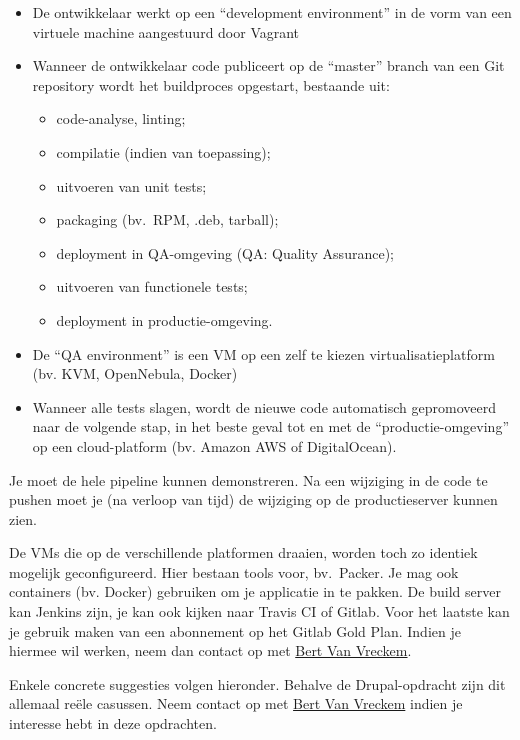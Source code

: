 \begin{itemize}
\item De ontwikkelaar werkt op een ``development environment'' in de vorm van een virtuele machine aangestuurd door Vagrant
\item Wanneer de ontwikkelaar code publiceert op de ``master'' branch van een Git repository wordt het buildproces opgestart, bestaande uit:

  \begin{itemize}
  \item code-analyse, linting;
  \item compilatie (indien van toepassing);
  \item uitvoeren van unit tests;
  \item packaging (bv.~RPM, .deb, tarball);
  \item deployment in QA-omgeving (QA: Quality Assurance);
  \item uitvoeren van functionele tests;
  \item deployment in productie-omgeving.
  \end{itemize}

\item De ``QA environment'' is een VM op een zelf te kiezen virtualisatieplatform (bv. KVM, OpenNebula, Docker)
\item Wanneer alle tests slagen, wordt de nieuwe code automatisch gepromoveerd naar de volgende stap, in het beste geval tot en met de ``productie-omgeving'' op een cloud-platform (bv. Amazon AWS of DigitalOcean).
\end{itemize}

Je moet de hele pipeline kunnen demonstreren. Na een wijziging in de code te pushen moet je (na verloop van tijd) de wijziging op de productieserver kunnen zien.

De VMs die op de verschillende platformen draaien, worden toch zo identiek mogelijk geconfigureerd. Hier bestaan tools voor, bv.~Packer.  Je mag ook containers (bv. Docker) gebruiken om je applicatie in te pakken. De build server kan Jenkins zijn, je kan ook kijken naar Travis CI of Gitlab. Voor het laatste kan je gebruik maken van een abonnement op het Gitlab Gold Plan. Indien je hiermee wil werken, neem dan contact op met \href{mailto:bert.vanvreckem@hogent.be}{Bert Van Vreckem}.

Enkele concrete suggesties volgen hieronder. Behalve de Drupal-opdracht zijn dit allemaal reële casussen. Neem contact op met \href{mailto:bert.vanvreckem@hogent.be}{Bert Van Vreckem} indien je interesse hebt in deze opdrachten.

